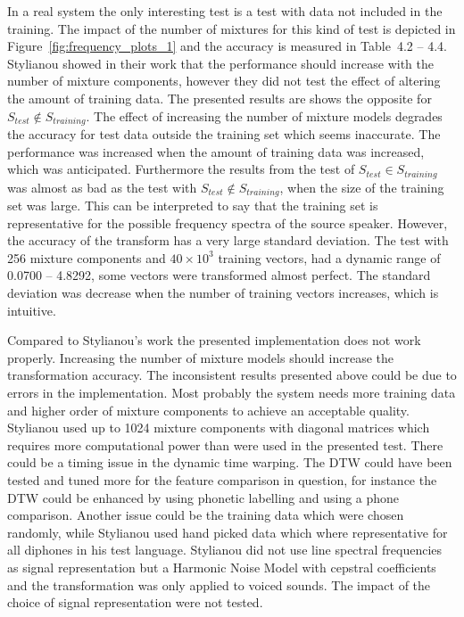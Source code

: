 In a real system the only interesting test is a test with data not included in the training. The impact of the number of mixtures for this kind of test is depicted in Figure~\ref{fig:frequency_plots_1} and the accuracy is measured in Table~4.2 -- 4.4. Stylianou \etal \cite{stylianou98} showed in their work that the performance should increase with the number of mixture components, however they did not test the effect of altering the amount of training data. The presented results are shows the opposite for $S_{test}\notin S_{training}$. The effect of increasing the number of mixture models degrades the accuracy for test data outside the training set which seems inaccurate. The performance was increased when the amount of training data was increased, which was anticipated. Furthermore the results from the test of $S_{test}\in S_{training}$ was almost as bad as the test with $S_{test}\notin S_{training}$, when the size of the training set was large. This can be interpreted to say that the training set is representative for the possible frequency spectra of the source speaker. However, the accuracy of the transform has a very large standard deviation. The test with 256 mixture components and $40\times 10^3$ training vectors, had a dynamic range of 0.0700 -- 4.8292, \ie some vectors were transformed almost perfect. The standard deviation was decrease when the number of training vectors increases, which is intuitive. 

Compared to Stylianou's work \cite{stylianou98} the presented implementation does not work properly. Increasing the number of mixture models should increase the transformation accuracy. The inconsistent results presented above could be due to errors in the implementation. Most probably the system needs more training data and higher order of mixture components to achieve an acceptable quality. Stylianou used up to 1024 mixture components with diagonal matrices which requires more computational power than were used in the presented test. There could be a timing issue in the dynamic time warping. The DTW could have been tested and tuned more for the feature comparison in question, for instance the DTW could be enhanced by using phonetic labelling and using a phone comparison. Another issue could be the training data which were chosen randomly, while Stylianou used hand picked data which where representative for all diphones in his test language. Stylianou did not use line spectral frequencies as signal representation but a Harmonic Noise Model with cepstral coefficients and the transformation was only applied to voiced sounds. The impact of the choice of signal representation were not tested.



